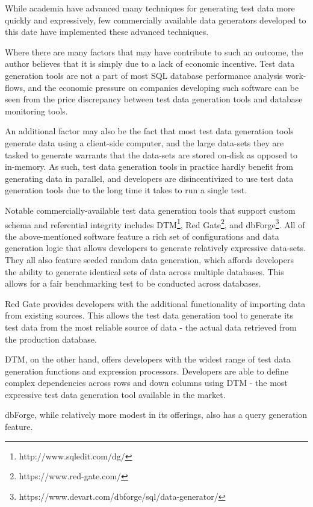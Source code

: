 \documentclass[12pt]{article}
\begin{document}
\begin{spacing}{1.9}
		While academia have advanced many techniques for generating test data more quickly and expressively, few commercially available data generators developed to this date have implemented these advanced techniques.
		
		Where there are many factors that may have contribute to such an outcome, the author believes that it is simply due to a lack of economic incentive. Test data generation tools are not a part of most SQL database performance analysis work-flows, and the economic pressure on companies developing such software can be seen from the price discrepancy between test data generation tools and database monitoring tools.
		
		An additional factor may also be the fact that most test data generation tools generate data using a client-side computer, and the large data-sets they are tasked to generate warrants that the data-sets are stored on-disk as opposed to in-memory. As such, test data generation tools in practice hardly benefit from generating data in parallel, and developers are disincentivized to use test data generation tools due to the long time it takes to run a single test.
		
		Notable commercially-available test data generation tools that support custom schema and referential integrity includes DTM\footnote{http://www.sqledit.com/dg/}, Red Gate\footnote{https://www.red-gate.com/}, and dbForge\footnote{https://www.devart.com/dbforge/sql/data-generator/}. All of the above-mentioned software feature a rich set of configurations and data generation logic that allows developers to generate relatively expressive data-sets. They all also feature seeded random data generation, which affords developers the ability to generate identical sets of data across multiple databases. This allows for a fair benchmarking test to be conducted across databases.
		
		Red Gate provides developers with the additional functionality of importing data from existing sources. This allows the test data generation tool to generate its test data from the most reliable source of data - the actual data retrieved from the production database.
		
		DTM, on the other hand, offers developers with the widest range of test data generation functions and expression processors. Developers are able to define complex dependencies across rows and down columns using DTM - the most expressive test data generation tool available in the market. 
		
		dbForge, while relatively more modest in its offerings, also has a query generation feature.
		

\end{spacing}
\end{document}
